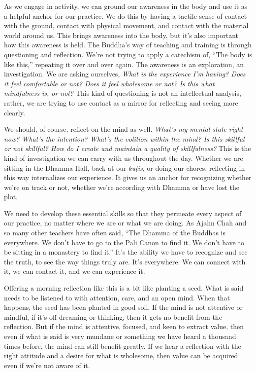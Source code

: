 
As we engage in activity, we can ground our awareness in the body and 
use it as a helpful anchor for our practice. We do this by having a 
tactile sense of contact with the ground, contact with physical 
movement, and contact with the material world around us. This brings 
awareness into the body, but it's also important how this awareness is 
held. The Buddha's way of teaching and training is through questioning 
and reflection. We're not trying to apply a catechism of, ``The body is 
like this,'' repeating it over and over again. The awareness is an 
exploration, an investigation. We are asking ourselves, \emph{What is 
the experience I'm having? Does it feel comfortable or not? Does it 
feel wholesome or not? Is this what mindfulness is, or not?} This kind 
of questioning is not an intellectual analysis, rather, we are trying 
to use contact as a mirror for reflecting and seeing more clearly.

We should, of course, reflect on the mind as well. \emph{What's my 
mental state right now? What's the intention? What's the volition 
within the mind? Is this skillful or not skillful? How do I create and 
maintain a quality of skillfulness?} This is the kind of investigation 
we can carry with us throughout the day. Whether we are sitting in the 
Dhamma Hall, back at our \emph{kuṭis}, or doing our chores, 
reflecting in this way internalizes our experience. It gives us an 
anchor for recognizing whether we're on track or not, whether we're 
according with Dhamma or have lost the plot.

We need to develop these essential skills so that they permeate every 
aspect of our practice, no matter where we are or what we are doing. As 
Ajahn Chah and so many other teachers have often said, ``The Dhamma of 
the Buddhas is everywhere. We don't have to go to the Pāli Canon to 
find it. We don't have to be sitting in a monastery to find it.'' It's 
the ability we have to recognize and see the truth, to see the way 
things truly are. It's everywhere. We can connect with it, we can 
contact it, and we can experience it.


Offering a morning reflection like this is a bit like planting a seed. 
What is said needs to be listened to with attention, care, and an open 
mind. When that happens, the seed has been planted in good soil. If the 
mind is not attentive or mindful, if it's off dreaming or thinking, 
then it gets no benefit from the reflection. But if the mind is 
attentive, focused, and keen to extract value, then even if what is 
said is very mundane or something we have heard a thousand times 
before, the mind can still benefit greatly. If we hear a reflection 
with the right attitude and a desire for what is wholesome, then value 
can be acquired even if we're not aware of it.

